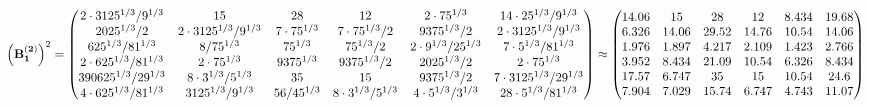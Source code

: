 \documentclass[10pt,a4paper]{article}
\begin{document}
	\[
		\left(\bold{B_1^{(2)}}\right)^{2} = 
		\begin{pmatrix}
			{{2} \cdot {3125^ {1 / 3}}} / {{9^ {1 / 3}}} & {{15}}{} & {{28}}{} & {{12}}{} & {{2} \cdot {75^ {1 / 3}}}{} & {{14} \cdot {25^ {1 / 3}}} / {{9^ {1 / 3}}} \\
			{{2025^ {1 / 3}}} / {{2}} & {{2} \cdot {3125^ {1 / 3}}} / {{9^ {1 / 3}}} & {{7} \cdot {75^ {1 / 3}}}{} & {{7} \cdot {75^ {1 / 3}}} / {{2}} & {{9375^ {1 / 3}}} / {{2}} & {{2} \cdot {3125^ {1 / 3}}} / {{9^ {1 / 3}}} \\
			{{625^ {1 / 3}}} / {{81^ {1 / 3}}} & {{8}} / {{75^ {1 / 3}}} & {{75^ {1 / 3}}}{} & {{75^ {1 / 3}}} / {{2}} & {{2} \cdot {9^ {1 / 3}}} / {{25^ {1 / 3}}} & {{7} \cdot {5^ {1 / 3}}} / {{81^ {1 / 3}}} \\
			{{2} \cdot {625^ {1 / 3}}} / {{81^ {1 / 3}}} & {{2} \cdot {75^ {1 / 3}}}{} & {{9375^ {1 / 3}}}{} & {{9375^ {1 / 3}}} / {{2}} & {{2025^ {1 / 3}}} / {{2}} & {{2} \cdot {75^ {1 / 3}}}{} \\
			{{390625^ {1 / 3}}} / {{2}{9^ {1 / 3}}} & {{8} \cdot {3^ {1 / 3}}} / {{5^ {1 / 3}}} & {{35}}{} & {{15}}{} & {{9375^ {1 / 3}}} / {{2}} & {{7} \cdot {3125^ {1 / 3}}} / {{2}{9^ {1 / 3}}} \\
			{{4} \cdot {625^ {1 / 3}}} / {{81^ {1 / 3}}} & {{3125^ {1 / 3}}} / {{9^ {1 / 3}}} & {{56}} / {{45^ {1 / 3}}} & {{8} \cdot {3^ {1 / 3}}} / {{5^ {1 / 3}}} & {{4} \cdot {5^ {1 / 3}}} / {{3^ {1 / 3}}} & {{28} \cdot {5^ {1 / 3}}} / {{81^ {1 / 3}}} \\
		\end{pmatrix}
		\approx
		\begin{pmatrix}
			14.06    & 15       & 28       & 12       & 8.434    & 19.68    \\
			6.326    & 14.06    & 29.52    & 14.76    & 10.54    & 14.06    \\
			1.976    & 1.897    & 4.217    & 2.109    & 1.423    & 2.766    \\
			3.952    & 8.434    & 21.09    & 10.54    & 6.326    & 8.434    \\
			17.57    & 6.747    & 35       & 15       & 10.54    & 24.6     \\
			7.904    & 7.029    & 15.74    & 6.747    & 4.743    & 11.07    \\
		\end{pmatrix}
	\]
\end{document}
